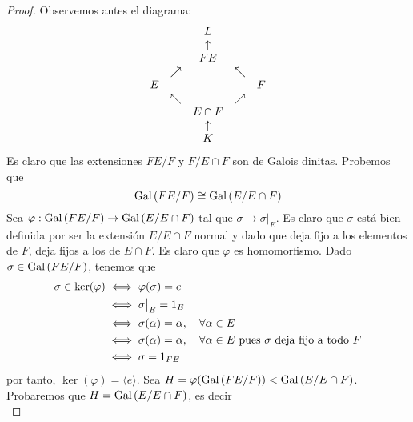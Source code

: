 \documentclass[12pt]{report}
\theoremstyle{largebreak}
\newcommand\cf[3]{\ensuremath{#1:#2\rightarrow#3}}
\begin{document}
    \begin{proof}
        Observemos antes el diagrama:
        \begin{equation*}
            \begin{array}[pos]{ccccc}
                & & L & & \\
                & & \uparrow & & \\
                & & FE & & \\
                & \nearrow & & \nwarrow & \\
                E & & & & F \\
                & \nwarrow & & \nearrow & \\
                & & E\cap F & & \\
                & & \uparrow & & \\
                & & K & & \\
            \end{array}
        \end{equation*}
        Es claro que las extensiones $FE/F$ y $F/E\cap F$ son de Galois dinitas. Probemos que
        \begin{equation*}
            \textup{Gal}\left(FE/F\right)\cong\textup{Gal}\left(E/E\cap F\right)
        \end{equation*}
        Sea $\cf{\varphi}{\Gal{FE/F}}{\Gal{E/E\cap F}}$ tal que $\sigma\mapsto \sigma\big|_E$. Es claro que $\sigma$ está bien definida por ser la extensión $E/E\cap F$ normal y dado que deja fijo a los elementos de $F$, deja fijos a los de $E\cap F$. Es claro que $\varphi$ es homomorfismo. Dado $\sigma\in\textup{Gal}\left(FE/F\right)$, tenemos que
        \begin{equation*}
            \begin{split}
                \sigma\in\ker(\varphi)&\iff \varphi(\sigma)=e\\
                &\iff \sigma\big|_E=1_E\\
                &\iff \sigma(\alpha)=\alpha,\quad\forall \alpha\in E\\
                &\iff \sigma(\alpha)=\alpha,\quad\forall \alpha\in E\textup{ pues $\sigma$ deja fijo a todo }F\\
                &\iff \sigma=1_{FE}\\
            \end{split}
        \end{equation*}
        por tanto, $\ker(\varphi)=\langle e\rangle$. Sea $H=\varphi(\textup{Gal}\left(FE/F\right))<\textup{Gal}\left(E/E\cap F\right)$. Probaremos que $H=\textup{Gal}\left(E/E\cap F\right)$, es decir
        \begin{equation*}

\end{equation*}
\end{proof}
\end{document}
